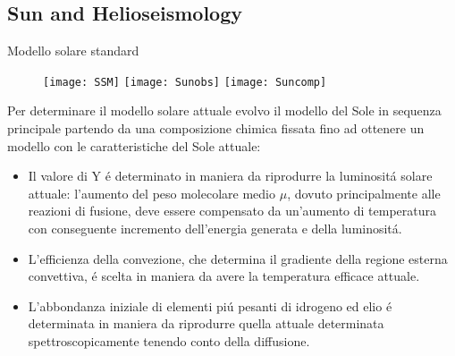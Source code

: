 \subsection{Sun and Helioseismology}

\begin{frame}{Modello solare standard}
		\begin{figure}[!ht] 
		\texttt{[image: SSM]}\label{fig:SSM}
		\texttt{[image: Sunobs]}\label{fig:Sunobs}
		\texttt{[image: Suncomp]}\label{fig:Suncomp}
		\end{figure}
    Per determinare il modello solare attuale evolvo il modello del Sole in sequenza principale partendo da una composizione chimica fissata fino ad ottenere un modello con le caratteristiche del Sole attuale:
\begin{itemize}
\item Il valore di Y \'e determinato in maniera da riprodurre la luminosit\'a solare attuale: l'aumento del peso molecolare medio $\mu$, dovuto principalmente alle reazioni di fusione, deve essere compensato da un'aumento di temperatura con conseguente incremento dell'energia generata e della luminosit\'a.
\item L'efficienza della convezione, che determina il gradiente della regione esterna convettiva, \'e scelta in maniera da avere la temperatura efficace attuale.
\item L'abbondanza iniziale di elementi pi\'u pesanti di idrogeno ed elio \'e determinata in maniera da riprodurre quella attuale determinata spettroscopicamente tenendo conto della diffusione.
\end{itemize}
\end{frame}

